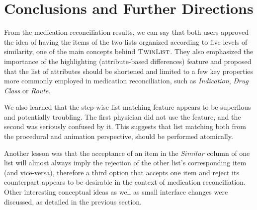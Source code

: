 \documentclass{chi2009}
\newcommand{\TwinList}{\textsc{TwinList}}
\newcommand{\Similar}{\textit{Similar}}
\begin{document}
\section{Conclusions and Further Directions}


From the medication reconciliation results, we can say that both users approved the idea of having the items of the two lists organized according to five levels of similarity, one of the main concepts behind $\TwinList$. They also emphasized the importance of the highlighting (attribute-based differences) feature and proposed that the list of attributes should be shortened and limited to a few key properties more commonly employed in medication reconciliation, such as \textit{Indication}, \textit{Drug Class} or \textit{Route}.

We also learned that the step-wise list matching feature appears to be superflous and potentially troubling. The first physician did not use the feature, and the second was seriously confused by it. This suggests that list matching both from the procedural and animation perspective, should be performed atomically. 

Another lesson was that the acceptance of an item in the $\Similar$ column of one list will almost always imply the rejection of the other list's corresponding item (and vice-versa), therefore a third option that accepts one item and reject its counterpart appears to be desirable in the context of medication reconciliation. Other interesting conceptual ideas as well as small interface changes were discussed, as detailed in the previous section.






\end{document}
